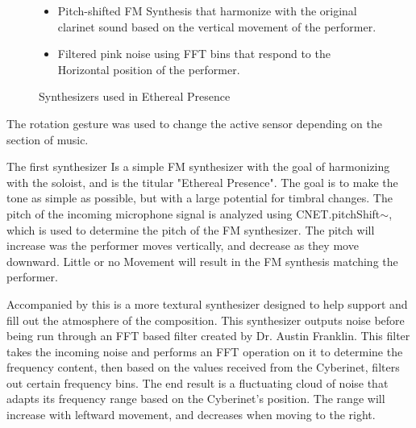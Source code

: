 \begin{figure}
    \centering
\begin{itemize}
    \item Pitch-shifted FM Synthesis that harmonize with the original clarinet sound based on the vertical movement of the performer.
    \item Filtered pink noise using FFT bins that respond to the Horizontal position of the performer.
\end{itemize}
    \caption{Synthesizers used in Ethereal Presence}
    \label{fig:etherealSynths}
\end{figure}

The rotation gesture was used to change the active sensor depending on the section of music.

The first synthesizer Is a simple FM synthesizer with the goal of harmonizing with the soloist, and is the titular "Ethereal Presence". The goal is to make the tone as simple as possible, but with a large potential for timbral changes. The pitch of the incoming microphone signal is analyzed using CNET.pitchShift$\sim$, which is used to determine the pitch of the FM synthesizer. The pitch will increase was the performer moves vertically, and decrease as they move downward. Little or no Movement will result in the FM synthesis matching the performer.

Accompanied by this is a more textural synthesizer designed to help support and fill out the atmosphere of the composition. This synthesizer outputs noise before being run through an FFT based filter created by Dr. Austin Franklin. This filter takes the incoming noise and performs an FFT operation on it to determine the frequency content, then based on the values received from the Cyberinet, filters out certain frequency bins. The end result is a fluctuating cloud of noise that adapts its frequency range based on the Cyberinet's position. The range will increase with leftward movement, and decreases when moving to the right.


